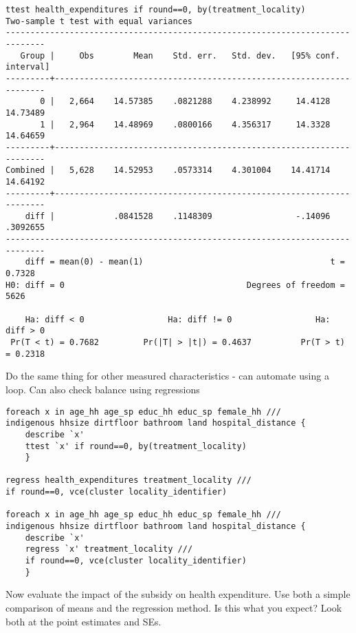 \documentclass[12pt]{article}
\begin{document}
\begin{verbatim}
ttest health_expenditures if round==0, by(treatment_locality)
Two-sample t test with equal variances
------------------------------------------------------------------------------
   Group |     Obs        Mean    Std. err.   Std. dev.   [95% conf. interval]
---------+--------------------------------------------------------------------
       0 |   2,664    14.57385    .0821288    4.238992     14.4128    14.73489
       1 |   2,964    14.48969    .0800166    4.356317     14.3328    14.64659
---------+--------------------------------------------------------------------
Combined |   5,628    14.52953    .0573314    4.301004    14.41714    14.64192
---------+--------------------------------------------------------------------
    diff |            .0841528    .1148309                 -.14096    .3092655
------------------------------------------------------------------------------
    diff = mean(0) - mean(1)                                      t =   0.7328
H0: diff = 0                                     Degrees of freedom =     5626

    Ha: diff < 0                 Ha: diff != 0                 Ha: diff > 0
 Pr(T < t) = 0.7682         Pr(|T| > |t|) = 0.4637          Pr(T > t) = 0.2318

\end{verbatim}
 Do the same thing for other measured characteristics - can automate using a loop. Can also check balance using regressions
\begin{verbatim}
foreach x in age_hh age_sp educ_hh educ_sp female_hh ///
indigenous hhsize dirtfloor bathroom land hospital_distance {
	describe `x'
	ttest `x' if round==0, by(treatment_locality)
	}
	
regress health_expenditures treatment_locality ///
if round==0, vce(cluster locality_identifier)
	
foreach x in age_hh age_sp educ_hh educ_sp female_hh ///
indigenous hhsize dirtfloor bathroom land hospital_distance {
	describe `x'
	regress `x' treatment_locality ///
	if round==0, vce(cluster locality_identifier)
	}
\end{verbatim}

Now evaluate the impact of the subsidy on health expenditure. Use both a simple comparison of means and the regression method. Is this what you expect? Look both at the point estimates and SEs. 
\end{document}
